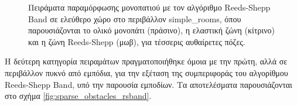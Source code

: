 \begin{figure}[!ht]
	\caption{Πειράματα παραμόρφωσης μονοπατιού με τον αλγόριθμο Reeds-Shepp Band σε ελεύθερο χώρο στο περιβάλλον simple{\_}rooms, όπου παρουσιάζονται το ολικό μονοπάτι (πράσινο), η ελαστική ζώνη (κίτρινο) και η ζώνη Reeds-Shepp (μωβ), για τέσσερις αυθαίρετες πόζες.}
	\label{fig:simple_rooms_rsband}
\end{figure}

\bigskip
Η δεύτερη κατηγορία πειραμάτων πραγματοποιήθηκε όμοια με την πρώτη, αλλά σε περιβάλλον πυκνό από εμπόδια, για την εξέταση της συμπεριφοράς του αλγορίθμου Reeds-Shepp Band, υπό την παρουσία εμποδίων. Τα αποτελέσματα παρουσιάζονται στο σχήμα \ref{fig:sparse_obstacles_rsband}.

\begin{figure}[!ht]
	\centering
	 \hspace{0.02\linewidth}
	  \hspace{0.02\linewidth}
	\\


\end{figure}
